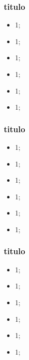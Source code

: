 \documentclass{beamer}
\begin{document}
\begin{frame}
    \frametitle{titulo}

    \begin{itemize}
        \item 1;
        \item 1;
        \item 1;
        \item 1;
        \item 1;
        \item 1;
    \end{itemize}
\end{frame}

\begin{frame}
    \frametitle{titulo}

    \begin{itemize}
        \item 1;
        \item 1;
        \item 1;
        \item 1;
        \item 1;
        \item 1;
    \end{itemize}
\end{frame}

\begin{frame}
    \frametitle{titulo}

    \begin{itemize}
        \item 1;
        \item 1;
        \item 1;
        \item 1;
        \item 1;
        \item 1;
    \end{itemize}
\end{frame}
\end{document}
